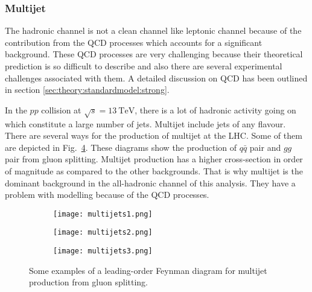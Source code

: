 \subsubsection{Multijet}%
\label{sec:analysisstrategy:multijets}
The hadronic channel is not a clean channel like leptonic channel because of the contribution from the QCD processes which accounts for a significant background. These QCD processes are very challenging because their theoretical prediction is so difficult to describe and also there are several experimental challenges associated with them. A detailed discussion on QCD has been outlined in section \ref{sec:theory:standardmodel:strong}.

In the $pp$ collision at $\sqrt{s}=\SI{13}{\tera\electronvolt}$, there is a lot of hadronic activity going on which constitute a large number of jets. Multijet include jets of any flavour. There are several ways for the production of multijet at the LHC. Some of them are depicted in Fig.\ \ref{fig:analysisstrategy:multijets}. These diagrams show the production of $q\bar{q}$ pair and $gg$ pair from gluon splitting. Multijet production has a higher cross-section in order of magnitude as compared to the other backgrounds. That is why multijet is the dominant background in the all-hadronic channel of this analysis. They have a problem with modelling because of the QCD processes.

\begin{figure}[hbt!]
	\centering
	\begin{subfigure}{.45\textwidth}
		\centering
		\texttt{[image: multijets1.png]}
		\caption{}
		\label{fig:analysisstrategy:multijets1}
	\end{subfigure}\hspace{0.5cm}
	\begin{subfigure}{.4\textwidth}
		\centering
		\texttt{[image: multijets2.png]}
		\caption{}
		\label{fig:analysisstrategy:multijets2}
	\end{subfigure}\hspace{0.5cm}
	\begin{subfigure}{.4\textwidth}
	\centering
	\texttt{[image: multijets3.png]}
	\caption{}
	\label{fig:analysisstrategy:multijets3}
	\end{subfigure}
\caption{Some examples of a leading-order Feynman diagram for multijet production from gluon splitting.}
\label{fig:analysisstrategy:multijets}
\end{figure}

